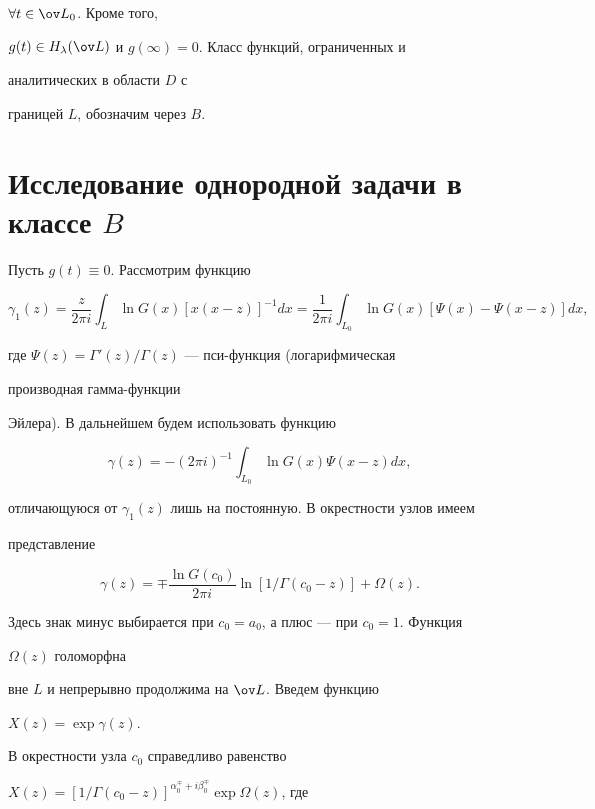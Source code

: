 $\forall t\in\ov L_0$. Кроме того, 


$g(t)\in H_\lambda(\ov L)$ и $g(\infty)=0$. Класс функций, ограниченных и 


аналитических в области $D$ с 


границей $L$, обозначим через $B$. 


 


 


\section{Исследование однородной задачи в классе $B$} 


 


Пусть $g(t)\equiv0$. Рассмотрим функцию 


$$ 


\gamma_1(z)=\frac{z}{2\pi i}\int_L \ln G(x)[x(x-z)]^{-1}dx= 


\frac{1}{2\pi i}\int_{L_0}\ln G(x)[\Psi(x)-\Psi(x-z)]dx, 


$$ 


где $\Psi(z)=\Gamma'(z)/\Gamma(z)$ --- пси-функция (логарифмическая 


производная гамма-функции 


Эйлера). В дальнейшем будем использовать функцию 


$$ 


\gamma(z)=-(2\pi i)^{-1}\int_{L_0}\ln G(x)\Psi(x-z)dx, 


$$ 


отличающуюся от $\gamma_1(z)$ лишь на постоянную. В окрестности узлов имеем 


представление 


$$ 


\gamma(z)=\mp\frac{\ln G(c_0)}{2\pi i}\ln[1/\Gamma(c_0-z)]+ 


\Omega(z). 


$$ 


Здесь знак минус выбирается при $c_0=a_0$, а плюс --- при $c_0=1$. Функция 


$\Omega(z)$ голоморфна 


вне $L$ и непрерывно продолжима на $\ov L$. Введем функцию 


$X(z)=\exp \gamma(z)$. 


В окрестности узла $c_0$ справедливо равенство 


$X(z)=[1/\Gamma(c_0-z)]^{\alpha^\mp_0+i\beta^\mp_0}\exp\Omega(z)$, где 



